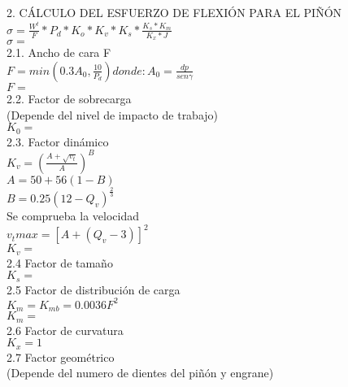 \documentclass[a4paper,9pt,vertical]{article}
\begin{document}
\begin{multicols}{2}
    2.	CÁLCULO DEL ESFUERZO DE FLEXIÓN PARA EL PIÑÓN\\
    
    $\sigma = \frac{W^t}{F}*P_d * K_o * K_v * K_s * \frac{K_s*K_m}{K_x*J}$\\
    $\sigma =  $\\

    2.1.	Ancho de cara F\\

    $F = min(0.3A_0, \frac{10}{P_d}) donde: A_0 = \frac{dp}{sen\gamma}$\\
    $F =  $\\
    
    
    2.2.	Factor de sobrecarga\\
    (Depende del nivel de impacto de trabajo)\\
    
    $K_0 =  $\\
    
    2.3.	Factor dinámico \\
    
    $K_v = (\frac{A+\sqrt{v_t}}{A})^B$\\
    $A = 50+56(1-B)$\\
    $B = 0.25(12-Q_v)^{\frac{2}{3}}$\\

    Se comprueba la velocidad\\

    $v_tmax = [A+(Q_v-3)]^2$\\
    
    $K_v =  $\\
    
    2.4   	Factor de tamaño \\
    
    $K_s =  $\\
    
    2.5	Factor de distribución de carga\\
    
    $K_m=K_{mb}=0.0036F^2$\\
    
    $K_m =  $\\
    
    2.6	Factor de curvatura\\
    
    $K_x = 1$\\
    
    2.7	Factor geométrico \\
    (Depende del numero de dientes del piñón y engrane)\\
    

\end{multicols}
\end{document}
